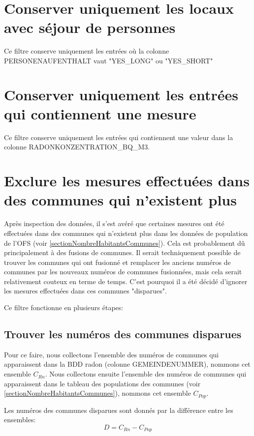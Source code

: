 
\section{Conserver uniquement les locaux avec séjour de personnes}\label{filter:PERSONENAUFENTHALT}
Ce filtre conserve uniquement les entrées où la colonne PERSONENAUFENTHALT vaut "YES\_LONG" ou "YES\_SHORT"


\section{Conserver uniquement les entrées qui contiennent une mesure}
Ce filtre conserve uniquement les entrées qui contiennent une valeur dans la colonne RADONKONZENTRATION\_BQ\_M3.


\section{Exclure les mesures effectuées dans des communes qui n'existent plus}
Après inspection des données, il s'est avéré que certaines mesures ont été effectuées dans des communes qui n'existent plus dans les données de population de l'OFS (voir \ref{sectionNombreHabitantsCommunes}). Cela est probablement dû principalement à des fusions de communes. Il serait techniquement possible de trouver les communes qui ont fusionné et remplacer les anciens numéros de communes par les nouveaux numéros de communes fusionnées, mais cela serait relativement couteux en terme de temps. C'est pourquoi il a été décidé d'ignorer les mesures effectuées dans ces communes "disparues".

Ce filtre fonctionne en plusieurs étapes:
\subsection{Trouver les numéros des communes disparues}
Pour ce faire, nous collectons l'ensemble des numéros de communes qui apparaissent dans la BDD radon (colonne GEMEINDENUMMER), nommons cet ensemble $C_{Rn}$. Nous collectons ensuite l'ensemble des numéros de communes qui apparaissent dans le tableau des populations des communes (voir \ref{sectionNombreHabitantsCommunes}), nommons cet ensemble $C_{Pop}$. 

Les numéros des communes disparues sont donnés par la différence entre les ensembles: 
\begin{equation}
D = C_{Rn} - C_{Pop}
\end{equation}

